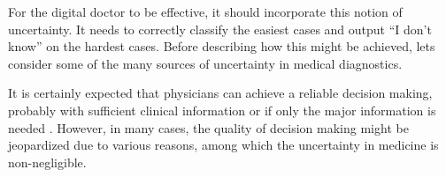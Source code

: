 \documentclass[11pt]{pnas-new}
\begin{document}
For the digital doctor to be effective, it should incorporate this
notion of uncertainty. It needs to correctly classify the easiest cases
and output ``I don't know'' on the hardest cases. Before describing how
this might be achieved, lets consider some of the many sources of
uncertainty in medical diagnostics.


It is certainly expected that physicians can achieve a reliable
decision making, probably with sufficient clinical information
\cite{mehta2011agreement} or if only the major information is needed
\cite{atiya2003interobserver}. However, in many cases, the quality of
decision making might be jeopardized due to various reasons, among
which the uncertainty in medicine is non-negligible.

\end{document}
